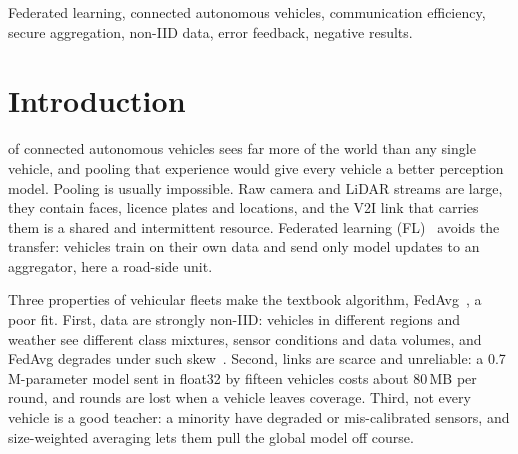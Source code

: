 \documentclass[journal]{IEEEtran}
\begin{document}
\begin{IEEEkeywords}
Federated learning, connected autonomous vehicles, communication efficiency, secure aggregation, non-IID data, error feedback, negative results.
\end{IEEEkeywords}

\section{Introduction}\label{sec:intro}
 of connected autonomous vehicles sees far more of the world than any single vehicle, and pooling that experience would give every vehicle a better perception model. Pooling is usually impossible. Raw camera and LiDAR streams are large, they contain faces, licence plates and locations, and the V2I link that carries them is a shared and intermittent resource. Federated learning (FL)~\cite{mcmahan2017fedavg,kairouz2021advances} avoids the transfer: vehicles train on their own data and send only model updates to an aggregator, here a road-side unit.

Three properties of vehicular fleets make the textbook algorithm, FedAvg~\cite{mcmahan2017fedavg}, a poor fit. First, data are strongly non-IID: vehicles in different regions and weather see different class mixtures, sensor conditions and data volumes, and FedAvg degrades under such skew~\cite{hsu2019noniid,hsieh2020quagmire,li2022niidbench}. Second, links are scarce and unreliable: a 0.7\,M-parameter model sent in float32 by fifteen vehicles costs about 80\,MB per round, and rounds are lost when a vehicle leaves coverage. Third, not every vehicle is a good teacher: a minority have degraded or mis-calibrated sensors, and size-weighted averaging lets them pull the global model off course.
\end{document}
